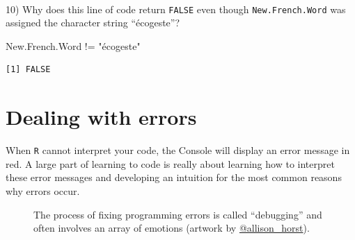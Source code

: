 \documentclass[
  letterpaper,
  DIV=11,
  numbers=noendperiod]{scrreprt}
\newenvironment{Shaded}{\begin{snugshade}}{\end{snugshade}}
\newcommand{\NormalTok}[1]{\textcolor[rgb]{0.00,0.23,0.31}{#1}}
\newcommand{\SpecialCharTok}[1]{\textcolor[rgb]{0.37,0.37,0.37}{#1}}
\newcommand{\StringTok}[1]{\textcolor[rgb]{0.13,0.47,0.30}{#1}}
\begin{document}
\begin{tcolorbox}
~

10) Why does this line of code return \texttt{FALSE} even though
\texttt{New.French.Word} was assigned the character string ``écogeste''?

\begin{Shaded}
\begin{Highlighting}[]
\NormalTok{New.French.Word }\SpecialCharTok{!=} \StringTok{"écogeste"}
\end{Highlighting}
\end{Shaded}

\begin{verbatim}
[1] FALSE
\end{verbatim}

\end{tcolorbox}

\section{Dealing with errors}\label{dealing-with-errors}

When \texttt{R} cannot interpret your code, the Console will display an
error message in red. A large part of learning to code is really about
learning how to interpret these error messages and developing an
intuition for the most common reasons why errors occur.

\begin{figure}


\caption{\label{fig-DebuggingMonster}The process of fixing programming
errors is called ``debugging'' and often involves an array of emotions
(artwork by
\href{https://allisonhorst.com/allison-horst}{@allison\_horst}).}

\end{figure}%
\end{document}
